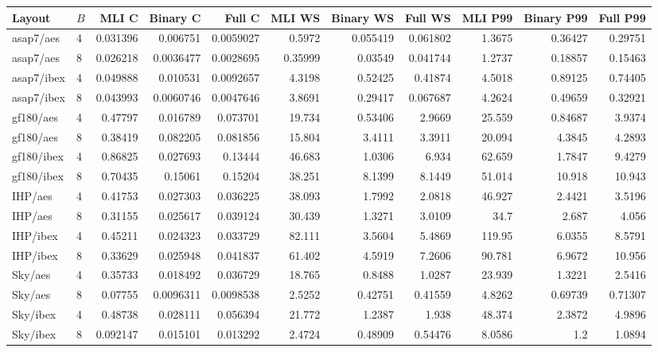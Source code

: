 \begin{tabular}{llrrrrrrrrr}
\toprule
Layout & $B$ & MLI C & Binary C & Full C & MLI WS & Binary WS & Full WS & MLI P99 & Binary P99 & Full P99 \\
\midrule
asap7/aes & 4 & 0.031396 & 0.006751 & 0.0059027 & 0.5972 & 0.055419 & 0.061802 & 1.3675 & 0.36427 & 0.29751 \\
asap7/aes & 8 & 0.026218 & 0.0036477 & 0.0028695 & 0.35999 & 0.03549 & 0.041744 & 1.2737 & 0.18857 & 0.15463 \\
asap7/ibex & 4 & 0.049888 & 0.010531 & 0.0092657 & 4.3198 & 0.52425 & 0.41874 & 4.5018 & 0.89125 & 0.74405 \\
asap7/ibex & 8 & 0.043993 & 0.0060746 & 0.0047646 & 3.8691 & 0.29417 & 0.067687 & 4.2624 & 0.49659 & 0.32921 \\
gf180/aes & 4 & 0.47797 & 0.016789 & 0.073701 & 19.734 & 0.53406 & 2.9669 & 25.559 & 0.84687 & 3.9374 \\
gf180/aes & 8 & 0.38419 & 0.082205 & 0.081856 & 15.804 & 3.4111 & 3.3911 & 20.094 & 4.3845 & 4.2893 \\
gf180/ibex & 4 & 0.86825 & 0.027693 & 0.13444 & 46.683 & 1.0306 & 6.934 & 62.659 & 1.7847 & 9.4279 \\
gf180/ibex & 8 & 0.70435 & 0.15061 & 0.15204 & 38.251 & 8.1399 & 8.1449 & 51.014 & 10.918 & 10.943 \\
IHP/aes & 4 & 0.41753 & 0.027303 & 0.036225 & 38.093 & 1.7992 & 2.0818 & 46.927 & 2.4421 & 3.5196 \\
IHP/aes & 8 & 0.31155 & 0.025617 & 0.039124 & 30.439 & 1.3271 & 3.0109 & 34.7 & 2.687 & 4.056 \\
IHP/ibex & 4 & 0.45211 & 0.024323 & 0.033729 & 82.111 & 3.5604 & 5.4869 & 119.95 & 6.0355 & 8.5791 \\
IHP/ibex & 8 & 0.33629 & 0.025948 & 0.041837 & 61.402 & 4.5919 & 7.2606 & 90.781 & 6.9672 & 10.956 \\
Sky/aes & 4 & 0.35733 & 0.018492 & 0.036729 & 18.765 & 0.8488 & 1.0287 & 23.939 & 1.3221 & 2.5416 \\
Sky/aes & 8 & 0.07755 & 0.0096311 & 0.0098538 & 2.5252 & 0.42751 & 0.41559 & 4.8262 & 0.69739 & 0.71307 \\
Sky/ibex & 4 & 0.48738 & 0.028111 & 0.056394 & 21.772 & 1.2387 & 1.938 & 48.374 & 2.3872 & 4.9896 \\
Sky/ibex & 8 & 0.092147 & 0.015101 & 0.013292 & 2.4724 & 0.48909 & 0.54476 & 8.0586 & 1.2 & 1.0894 \\
\bottomrule
\end{tabular}
